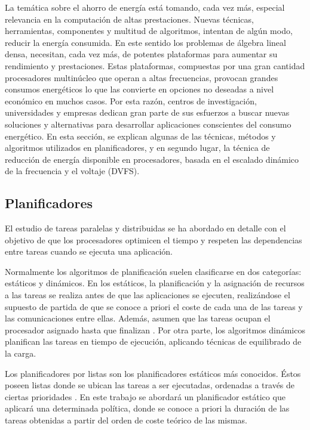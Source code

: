 La temática sobre el ahorro de energía está tomando, cada vez más, especial 
relevancia en la computación de altas prestaciones. Nuevas técnicas, 
herramientas, componentes y multitud de algoritmos, intentan de algún modo, 
reducir la energía consumida. En este sentido los problemas de álgebra lineal 
densa, necesitan, cada vez más, de potentes plataformas para aumentar su 
rendimiento y prestaciones. Estas plataformas, compuestas por una gran cantidad
procesadores multinúcleo que operan a altas frecuencias, provocan grandes consumos 
energéticos lo que las convierte en opciones no deseadas a nivel 
económico en muchos casos. Por esta razón, centros de investigación, 
universidades y empresas dedican gran parte de sus esfuerzos a buscar 
nuevas soluciones y alternativas para desarrollar aplicaciones conscientes
del consumo energético. En esta sección, se explican algunas de las 
técnicas, métodos y algoritmos utilizados en planificadores, y en segundo lugar,
la técnica de reducción de energía disponible en procesadores, basada en el
escalado dinámico de la frecuencia y el voltaje (DVFS).

\subsection{Planificadores}

El estudio de tareas paralelas y distribuidas se ha abordado en detalle con
el objetivo de que los procesadores optimicen el tiempo y respeten las dependencias
entre tareas cuando se ejecuta una aplicación.

Normalmente los algoritmos de planificación suelen clasificarse en dos categorías:
estáticos y dinámicos. En los estáticos, la planificación y la asignación de 
recursos a las tareas se realiza antes de que las aplicaciones se ejecuten, realizándose
el supuesto de partida de que se conoce a priori el coste de cada una de las tareas y las 
comunicaciones entre ellas. Además, asumen que las tareas ocupan el procesador
asignado hasta que finalizan \cite{Lo:1988:HAT:52029.52035,Sarkar:1987:PSP:37581}. 
Por otra parte, los algoritmos dinámicos planifican las tareas en tiempo de ejecución, 
aplicando técnicas de equilibrado de la carga. 

Los planificadores por listas son los planificadores estáticos más conocidos. 
Éstos poseen listas donde se ubican las tareas a ser ejecutadas, ordenadas 
a través de ciertas prioridades \cite{Rongheng,Mtibaa}. En este trabajo 
se abordará un planificador estático que aplicará una determinada política, 
donde se conoce a priori la duración de las tareas obtenidas a partir
del orden de coste teórico de las mismas.


